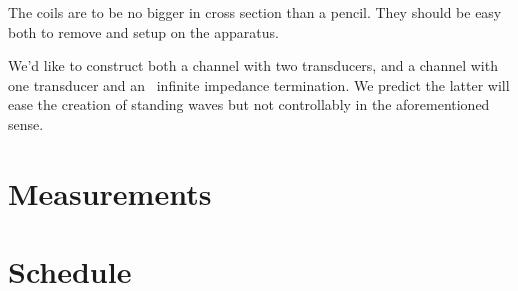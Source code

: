 The coils are to be no bigger in cross section than a pencil. They should be easy both to remove and setup on the apparatus.

We'd like to construct both a channel with two transducers, and a channel with one transducer and an ~infinite impedance termination. We predict the latter will ease the creation of standing waves but not controllably in the aforementioned sense.

\section{Measurements}

\section{Schedule}








